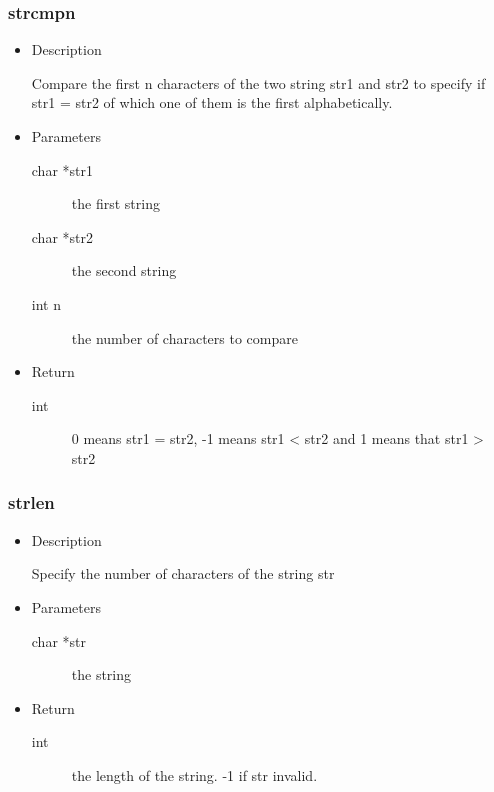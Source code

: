 \subsubsection{strcmpn}
\begin{itemize}
  \item{Description}

	 Compare the first n characters of the two string str1 and str2 to
	 specify if str1 = str2 of which one of them is the first alphabetically.
  \item{Parameters}
	 \begin{description}
		\item[char *str1] the first string
		\item[char *str2] the second string
		\item[int n] the number of characters to compare
	 \end{description}
  \item{Return}
	 \begin{description}
		\item[int] 0 means str1 = str2, -1 means str1 < str2 and 1 means that
		  str1 > str2
	 \end{description}
\end{itemize}

\subsubsection{strlen}
\begin{itemize}
  \item{Description}

	 Specify the number of characters of the string str
  \item{Parameters}
	 \begin{description}
		\item[char *str] the string
	 \end{description}
  \item{Return}
	 \begin{description}
		\item[int]	the length of the string. -1 if str invalid.
	 \end{description}
\end{itemize}

